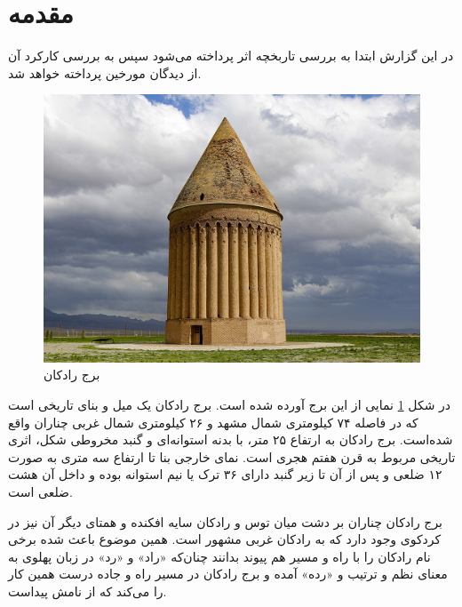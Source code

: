 \documentclass{article}
\title{\lr{Flight Dynamic II Bonus \#1}}
\author{علی بنی‌اسد 96108378}
\begin{document}
	\maketitle
	\section{مقدمه}
	در این گزارش ابتدا به بررسی تاربخچه اثر پرداخته می‌شود سپس به بررسی کارکرد آن از دیدگان مورخین پرداخته خواهد شد. 
	\begin{figure}[h!]
		\includegraphics[width=\linewidth]{figures/Radkan_Tower,_Chenaran_2015-01-26.jpg}
		\caption{برج رادکان}
		\label{radkan}
	\end{figure}


در شکل \ref{radkan} نمایی از این برج آورده شده است. برج رادکان یک میل و بنای تاریخی است که در فاصله ۷۴ کیلومتری شمال مشهد و ۲۶ کیلومتری شمال غربی چناران واقع شده‌است. برج رادکان به ارتفاع ۲۵ متر، با بدنه استوانه‌ای و گنبد مخروطی شکل، اثری تاریخی مربوط به قرن هفتم هجری است. نمای خارجی بنا تا ارتفاع سه متری به صورت ۱۲ ضلعی و پس از آن تا زیر گنبد دارای ۳۶ ترک یا نیم استوانه بوده و داخل آن هشت ضلعی است.

\clearpage
برج رادکان چناران بر دشت میان توس و رادکان سایه افکنده و همتای دیگر آن نیز در کردکوی وجود دارد که به رادکان غربی مشهور است. همین موضوع باعث شده برخی نام رادکان را با راه و مسیر هم پیوند بدانند چنان‌که «راد» و «رد» در زبان پهلوی به معنای نظم و ترتیب و «رده» آمده و برج رادکان در مسیر راه و جاده درست همین کار را می‌کند که از نامش پیداست.
\end{document}
